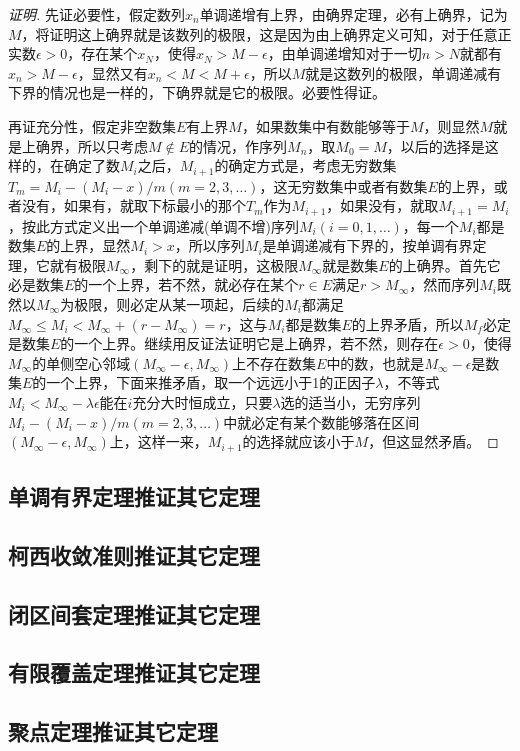 \begin{proof}[证明]
  先证必要性，假定数列$x_n$单调递增有上界，由确界定理，必有上确界，记为$M$，将证明这上确界就是该数列的极限，这是因为由上确界定义可知，对于任意正实数$\epsilon>0$，存在某个$x_N$，使得$x_N>M-\epsilon$，由单调递增知对于一切$n>N$就都有$x_n>M-\epsilon$，显然又有$x_n<M<M+\epsilon$，所以$M$就是这数列的极限，单调递减有下界的情况也是一样的，下确界就是它的极限。必要性得证。

  再证充分性，假定非空数集$E$有上界$M$，如果数集中有数能够等于$M$，则显然$M$就是上确界，所以只考虑$M\notin E$的情况，作序列$M_n$，取$M_0=M$，以后的选择是这样的，在确定了数$M_i$之后，$M_{i+1}$的确定方式是，考虑无穷数集$T_m = M_i-(M_i-x)/m(m=2,3,\ldots)$，这无穷数集中或者有数集$E$的上界，或者没有，如果有，就取下标最小的那个$T_m$作为$M_{i+1}$，如果没有，就取$M_{i+1}=M_i$，按此方式定义出一个单调递减(单调不增)序列$M_i(i=0,1,\ldots)$，每一个$M_i$都是数集$E$的上界，显然$M_i>x$，所以序列$M_i$是单调递减有下界的，按单调有界定理，它就有极限$M_{\infty}$，剩下的就是证明，这极限$M_{\infty}$就是数集$E$的上确界。首先它必是数集$E$的一个上界，若不然，就必存在某个$r \in E$满足$r>M_{\infty}$，然而序列$M_i$既然以$M_{\infty}$为极限，则必定从某一项起，后续的$M_i$都满足$M_{\infty} \leqslant M_i<M_{\infty}+(r-M_{\infty})=r$，这与$M_i$都是数集$E$的上界矛盾，所以$M_f$必定是数集$E$的一个上界。继续用反证法证明它是上确界，若不然，则存在$\epsilon > 0$，使得$M_{\infty}$的单侧空心邻域$(M_{\infty}-\epsilon, M_{\infty})$上不存在数集$E$中的数，也就是$M_{\infty}-\epsilon$是数集$E$的一个上界，下面来推矛盾，取一个远远小于1的正因子$\lambda$，不等式$M_i<M_{\infty}-\lambda \epsilon$能在$i$充分大时恒成立，只要$\lambda$选的适当小，无穷序列$M_i-(M_i-x)/m(m=2,3,\ldots)$中就必定有某个数能够落在区间$(M_{\infty}-\epsilon, M_{\infty})$上，这样一来，$M_{i+1}$的选择就应该小于$M$，但这显然矛盾。
\end{proof}

\subsection{单调有界定理推证其它定理}

\subsection{柯西收敛准则推证其它定理}

\subsection{闭区间套定理推证其它定理}

\subsection{有限覆盖定理推证其它定理}

\subsection{聚点定理推证其它定理}





